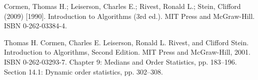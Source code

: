 \documentclass[runningheads, a4paper]{llncs}
\begin{document}
\begin{thebibliography}{4}
    
     Cormen, Thomas H.; Leiserson, Charles E.; Rivest, Ronald L.; Stein, Clifford (2009) [1990]. Introduction to Algorithms (3rd ed.). MIT Press and McGraw-Hill. ISBN 0-262-03384-4.
    
     Thomas H. Cormen, Charles E. Leiserson, Ronald L. Rivest, and Clifford Stein. Introduction to Algorithms, Second Edition. MIT Press and McGraw-Hill, 2001. ISBN 0-262-03293-7. Chapter 9: Medians and Order Statistics, pp. 183–196. Section 14.1: Dynamic order statistics, pp. 302–308.
\end{thebibliography}
        
    
\end{document}
